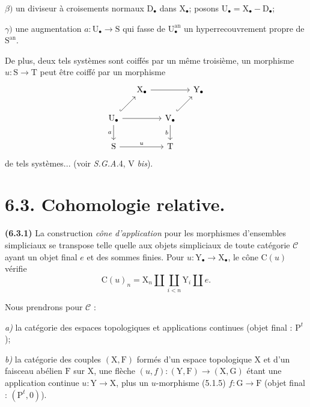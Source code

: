 \documentclass[11pt,leqno]{article}
\begin{document}
\noindent
\(\beta)\) un diviseur à croisements normaux \(\mathrm{D}_{\bullet}\) dans \(\mathrm{X}_{\bullet}\); posons \(\mathrm{U}_{\bullet}=\mathrm{X}_{\bullet}-\mathrm{D}_{\bullet}\);

\noindent
\(\gamma)\) une augmentation \(a:\mathrm{U}_{\bullet}\to\mathrm{S}\) qui fasse de \(\mathrm{U}_{\bullet}^{\mathrm{an}}\) un hyperrecouvrement propre de \(\mathrm{S}^{\mathrm{an}}\).

De plus, deux tels systèmes sont coiffés par un même troisième, un morphisme \(u:\mathrm{S}\to\mathrm{T}\) peut être coiffé par un morphisme
\[
\begin{tikzcd}[column sep=1.3em,row sep=1.8em]
& \mathrm{X}_{\bullet} \arrow[rr] & & \mathrm{Y}_{\bullet} \\
\mathrm{U}_{\bullet} \arrow[ur,hook] \arrow[rr] \arrow[d,"a"']
& & \mathrm{V}_{\bullet} \arrow[ur,hook] \arrow[d,"b"'] & \\
\mathrm{S} \arrow[rr,"u"] & & \mathrm{T} &
\end{tikzcd}
\]
de tels systèmes... (voir \textit{S.G.A.}4, V \textit{bis}).

\section*{6.3. Cohomologie relative.}

\textbf{(6.3.1)} La construction \textit{cône d’application} pour les morphismes d’ensembles simpliciaux se transpose telle quelle aux objets simpliciaux de toute catégorie \(\mathscr{C}\) ayant un objet final \(e\) et des sommes finies. Pour \(u:\mathrm{Y}_{\bullet}\to\mathrm{X}_{\bullet}\), le cône \(\mathrm{C}(u)\) vérifie
\[
\mathrm{C}(u)_n
=\mathrm{X}_n\amalg\coprod_{i<n}\mathrm{Y}_i\amalg e.
\]

Nous prendrons pour \(\mathscr{C}\) :

\noindent
\textit{a)} la catégorie des espaces topologiques et applications continues (objet final : \(\mathrm{P}^{t}\));

\noindent
\textit{b)} la catégorie des couples \((\mathrm{X},\mathrm{F})\) formés d’un espace topologique \(\mathrm{X}\) et d’un faisceau abélien \(\mathrm{F}\) sur \(\mathrm{X}\), une flèche \((u,f):(\mathrm{Y},\mathrm{F})\to(\mathrm{X},\mathrm{G})\) étant une application continue \(u:\mathrm{Y}\to\mathrm{X}\), plus un \(u\)-morphisme (5.1.5) \(f:\mathrm{G}\to\mathrm{F}\) (objet final : \((\mathrm{P}^{t},0)\)).
\end{document}
